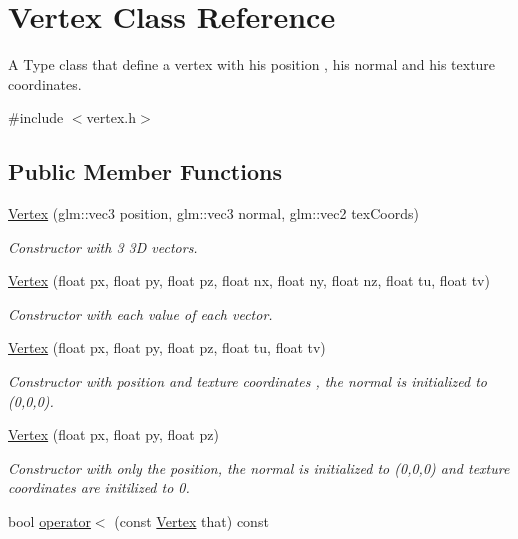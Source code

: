 \hypertarget{class_vertex}{}\section{Vertex Class Reference}
\label{class_vertex}


A Type class that define a vertex with his position , his normal and his texture coordinates.  




{\ttfamily \#include $<$vertex.\+h$>$}

\subsection*{Public Member Functions}
\begin{DoxyCompactItemize}
\item 
\mbox{\hyperlink{class_vertex_a4688b182b5b52ed10c978f5c11399d1f}{Vertex}} (glm\+::vec3 position, glm\+::vec3 normal, glm\+::vec2 tex\+Coords)
\begin{DoxyCompactList}\small\item\em Constructor with 3 3D vectors. \end{DoxyCompactList}\item 
\mbox{\hyperlink{class_vertex_ac20c5ee4fd9eab3c9dbf36e0a3a5b276}{Vertex}} (float px, float py, float pz, float nx, float ny, float nz, float tu, float tv)
\begin{DoxyCompactList}\small\item\em Constructor with each value of each vector. \end{DoxyCompactList}\item 
\mbox{\hyperlink{class_vertex_a81b6330b9b8bf45e357b1c9d3c7d37dc}{Vertex}} (float px, float py, float pz, float tu, float tv)
\begin{DoxyCompactList}\small\item\em Constructor with position and texture coordinates , the normal is initialized to (0,0,0). \end{DoxyCompactList}\item 
\mbox{\hyperlink{class_vertex_a5833a02aa7d93a5fafb6d84f8065322f}{Vertex}} (float px, float py, float pz)
\begin{DoxyCompactList}\small\item\em Constructor with only the position, the normal is initialized to (0,0,0) and texture coordinates are initilized to 0. \end{DoxyCompactList}\item 
bool \mbox{\hyperlink{class_vertex_af8eb8e095d89b9ab47d1e8814d9e353b}{operator$<$}} (const \mbox{\hyperlink{class_vertex}{Vertex}} that) const

\end{DoxyCompactItemize}
